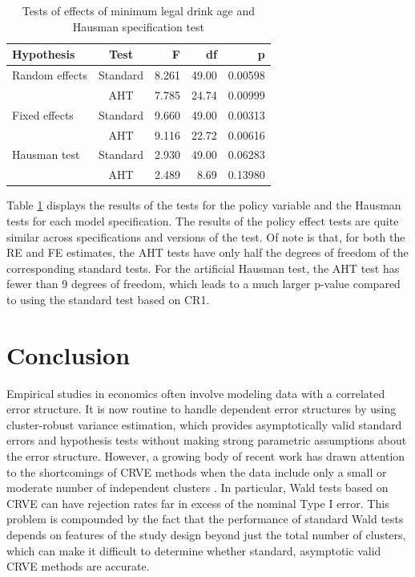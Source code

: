 \documentclass[12pt]{article}\usepackage[]{graphicx}\usepackage[]{color}
\begin{document}
\begin{table}[bth]
\centering
\caption{Tests of effects of minimum legal drink age and Hausman specification test} 
\label{tab:MLDA}
\begin{tabular}{lcrrr}
  \toprule
Hypothesis & Test & F & df & p \\ 
  \midrule
Random effects & Standard & 8.261 & 49.00 & 0.00598 \\ 
   & AHT & 7.785 & 24.74 & 0.00999 \\ 
  Fixed effects & Standard & 9.660 & 49.00 & 0.00313 \\ 
   & AHT & 9.116 & 22.72 & 0.00616 \\ 
   \midrule
Hausman test & Standard & 2.930 & 49.00 & 0.06283 \\ 
   & AHT & 2.489 & 8.69 & 0.13980 \\ 
   \bottomrule
\end{tabular}
\end{table}


Table \ref{tab:MLDA} displays the results of the tests for the policy variable and the Hausman tests for each model specification. 
The results of the policy effect tests are quite similar across specifications and versions of the test. 
Of note is that, for both the RE and FE estimates, the AHT tests have only half the degrees of freedom of the corresponding standard tests. 
For the artificial Hausman test, the AHT test has fewer than 9 degrees of freedom, which leads to a much larger p-value compared to using the standard test based on CR1. 

\section{Conclusion}
\label{sec:conclusion}

Empirical studies in economics often involve modeling data with a correlated error structure. 
It is now routine to handle dependent error structures by using cluster-robust variance estimation, which provides asymptotically valid standard errors and hypothesis tests without making strong parametric assumptions about the error structure. 
However, a growing body of recent work has drawn attention to the shortcomings of CRVE methods when the data include only a small or moderate number of independent clusters \citep{Cameron2008bootstrap, Cameron2015practitioners, Imbens2015robust, MacKinnon2016wild}. 
In particular, Wald tests based on CRVE can have rejection rates far in excess of the nominal Type I error. 
This problem is compounded by the fact that the performance of standard Wald tests depends on features of the study design beyond just the total number of clusters, which can make it difficult to determine whether standard, asymptotic valid CRVE methods are accurate. 
\end{document}

